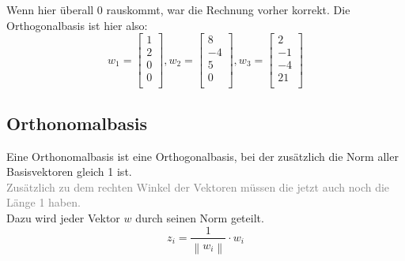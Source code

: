 \documentclass{article}
\begin{document}
			Wenn hier überall 0 rauskommt, war die Rechnung vorher korrekt. Die Orthogonalbasis ist hier also:
			\begin{equation*}
				w_1 = \begin{bmatrix} 1 \\ 2 \\ 0 \\ 0 \\ \end{bmatrix}, 
				w_2 = \begin{bmatrix} 8 \\ -4 \\ 5 \\ 0 \\ \end{bmatrix}, 
				w_3 = \begin{bmatrix} 2 \\ -1 \\ -4 \\ 21 \\ \end{bmatrix}
			\end{equation*}
		\subsection*{Orthonomalbasis}
			Eine Orthonomalbasis ist eine Orthogonalbasis, bei der zusätzlich die Norm aller Basisvektoren gleich 1 ist.\\
			\textcolor{gray}{Zusätzlich zu dem rechten Winkel der Vektoren müssen die jetzt auch noch die Länge 1 haben.}\\
			Dazu wird jeder Vektor $w$ durch seinen Norm geteilt.
			\begin{equation*}
				z_i = \frac{1}{\left\lVert w_i \right\rVert} \cdot w_i
			\end{equation*}
\end{document}
